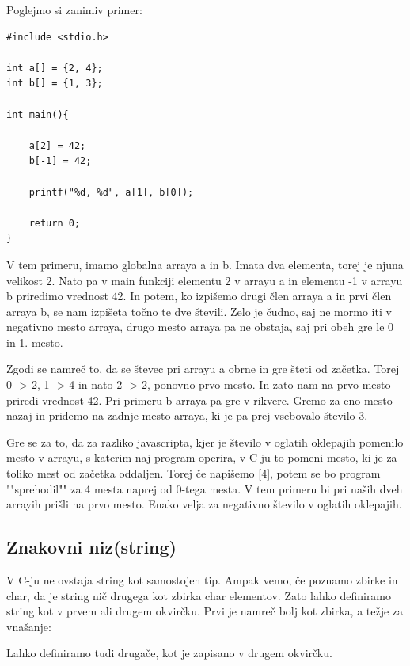 \documentclass[a4paper, 12pt]{article}
\begin{document}
Poglejmo si zanimiv primer:

\begin{lstlisting}
#include <stdio.h>

int a[] = {2, 4};
int b[] = {1, 3};

int main(){

	a[2] = 42;
	b[-1] = 42;

	printf("%d, %d", a[1], b[0]);

	return 0;
}
\end{lstlisting}

V tem primeru, imamo globalna arraya a in b. Imata dva elementa, torej je njuna velikost 2. Nato pa v main funkciji elementu 2 v arrayu a in elementu -1 v arrayu b priredimo vrednost 42. In potem, ko izpišemo drugi člen arraya a in prvi člen arraya b, se nam izpišeta točno te dve števili. Zelo je čudno, saj ne mormo iti v negativno mesto arraya, drugo mesto arraya pa ne obstaja, saj pri obeh gre le 0 in 1. mesto.\

Zgodi se namreč to, da se števec pri arrayu a obrne in gre šteti od začetka. Torej 0 -> 2, 1 -> 4 in nato 2 -> 2, ponovno prvo mesto. In zato nam na prvo mesto priredi vrednost 42. Pri primeru b arraya pa gre v rikverc. Gremo za eno mesto nazaj in pridemo na zadnje mesto arraya, ki je pa prej vsebovalo število 3.\

Gre se za to, da za razliko javascripta, kjer je število v oglatih oklepajih pomenilo mesto v arrayu, s katerim naj program operira, v C-ju to pomeni mesto, ki je za toliko mest od začetka oddaljen. Torej če napišemo [4], potem se bo program ""sprehodil"" za 4 mesta naprej od 0-tega mesta. V tem primeru bi pri naših dveh arrayih prišli na prvo mesto. Enako velja za negativno število v oglatih oklepajih.

\subsection{Znakovni niz(string)}
V C-ju ne ovstaja string kot samostojen tip. Ampak vemo, če poznamo zbirke in char, da je string nič drugega kot zbirka char elementov. Zato lahko definiramo string kot v prvem ali drugem okvirčku. Prvi je namreč bolj kot zbirka, a težje za vnašanje:\

{\centering{}}
{\centering{}\par}
Lahko definiramo tudi drugače, kot je zapisano v drugem okvirčku.\
\end{document}
